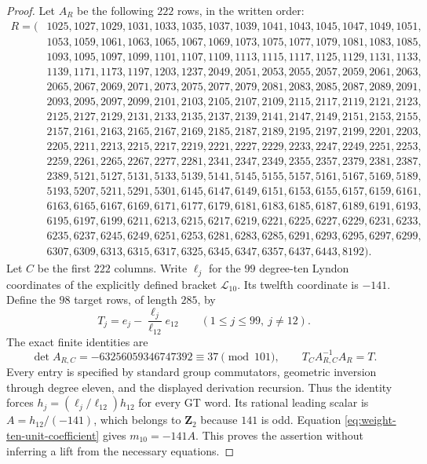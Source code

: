 \begin{proof}
Let $A_R$ be the following $222$ rows, in the written order:
\[
\begin{aligned}
R=(&1025,1027,1029,1031,1033,1035,1037,1039,1041,1043,1045,1047,1049,1051,\\
&1053,1059,1061,1063,1065,1067,1069,1073,1075,1077,1079,1081,1083,1085,\\
&1093,1095,1097,1099,1101,1107,1109,1113,1115,1117,1125,1129,1131,1133,\\
&1139,1171,1173,1197,1203,1237,2049,2051,2053,2055,2057,2059,2061,2063,\\
&2065,2067,2069,2071,2073,2075,2077,2079,2081,2083,2085,2087,2089,2091,\\
&2093,2095,2097,2099,2101,2103,2105,2107,2109,2115,2117,2119,2121,2123,\\
&2125,2127,2129,2131,2133,2135,2137,2139,2141,2147,2149,2151,2153,2155,\\
&2157,2161,2163,2165,2167,2169,2185,2187,2189,2195,2197,2199,2201,2203,\\
&2205,2211,2213,2215,2217,2219,2221,2227,2229,2233,2247,2249,2251,2253,\\
&2259,2261,2265,2267,2277,2281,2341,2347,2349,2355,2357,2379,2381,2387,\\
&2389,5121,5127,5131,5133,5139,5141,5145,5155,5157,5161,5167,5169,5189,\\
&5193,5207,5211,5291,5301,6145,6147,6149,6151,6153,6155,6157,6159,6161,\\
&6163,6165,6167,6169,6171,6177,6179,6181,6183,6185,6187,6189,6191,6193,\\
&6195,6197,6199,6211,6213,6215,6217,6219,6221,6225,6227,6229,6231,6233,\\
&6235,6237,6245,6249,6251,6253,6281,6283,6285,6291,6293,6295,6297,6299,\\
&6307,6309,6313,6315,6317,6325,6345,6347,6357,6437,6443,8192).
\end{aligned}
\]
Let $C$ be the first $222$ columns. Write $\ell_j$ for the
$99$ degree-ten Lyndon coordinates of the explicitly defined
bracket $\mathcal L_{10}$. Its twelfth coordinate is $-141$.
Define the $98$ target rows, of length $285$, by
\[
 T_j=e_j-\frac{\ell_j}{\ell_{12}}e_{12}
       \qquad(1\le j\le99,\ j\ne12).
\]
The exact finite identities are
\[
 \det A_{R,C}=-63256059346747392\equiv37\pmod{101},
 \qquad T_C A_{R,C}^{-1}A_R=T.
\]
Every entry is specified by standard group commutators, geometric
inversion through degree eleven, and the displayed derivation
recursion. Thus the identity forces
$h_j=(\ell_j/\ell_{12})h_{12}$ for every GT word. Its rational
leading scalar is $A=h_{12}/(-141)$, which belongs to
$\mathbf Z_2$ because $141$ is odd. Equation
\eqref{eq:weight-ten-unit-coefficient} gives $m_{10}=-141A$.
This proves the assertion without inferring a lift from the
necessary equations.
\end{proof}

